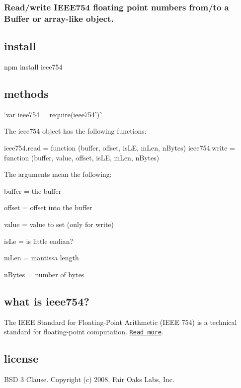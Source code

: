 \href{https://saucelabs.com/u/ieee754}{\tt }

\subsubsection*{Read/write I\+E\+E\+E754 floating point numbers from/to a Buffer or array-\/like object.}

\subsection*{install}


\begin{DoxyCode}
npm install ieee754
\end{DoxyCode}


\subsection*{methods}

`var ieee754 = require(\textquotesingle{}ieee754')\`{}

The {\ttfamily ieee754} object has the following functions\+:


\begin{DoxyCode}
ieee754.read = function (buffer, offset, isLE, mLen, nBytes)
ieee754.write = function (buffer, value, offset, isLE, mLen, nBytes)
\end{DoxyCode}


The arguments mean the following\+:


\begin{DoxyItemize}
\item buffer = the buffer
\item offset = offset into the buffer
\item value = value to set (only for {\ttfamily write})
\item is\+Le = is little endian?
\item m\+Len = mantissa length
\item n\+Bytes = number of bytes
\end{DoxyItemize}

\subsection*{what is ieee754?}

The I\+E\+EE Standard for Floating-\/\+Point Arithmetic (I\+E\+EE 754) is a technical standard for floating-\/point computation. \href{http://en.wikipedia.org/wiki/IEEE_floating_point}{\tt Read more}.

\subsection*{license}

B\+SD 3 Clause. Copyright (c) 2008, Fair Oaks Labs, Inc. 